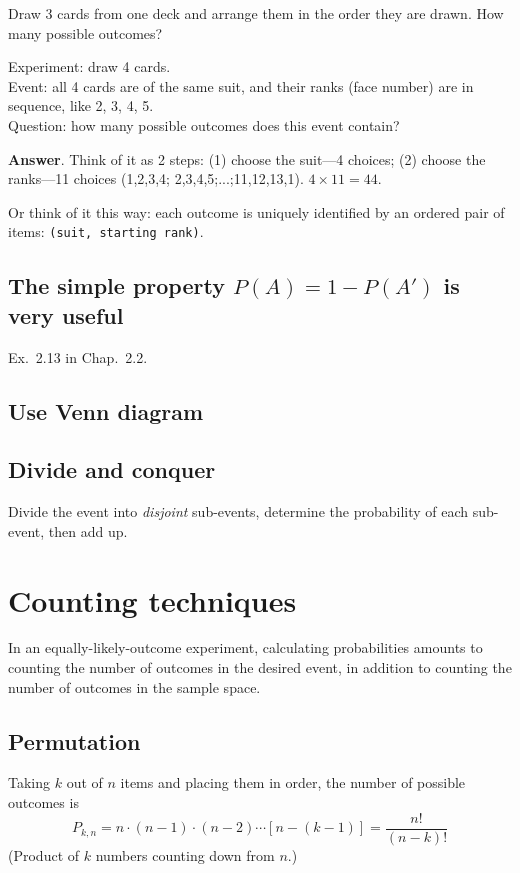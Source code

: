 \documentclass[12pt]{article}
\begin{document}
\example
Draw 3 cards from one deck and arrange them in the order they are drawn.
How many possible outcomes?

\example
Experiment: draw 4 cards.\\
Event: all 4 cards are of the same suit, and their ranks (face
number) are in sequence, like 2, 3, 4, 5.\\
Question: how many possible outcomes does this event contain?

\textbf{Answer}.
Think of it as 2 steps: (1) choose the suit---4 choices;
(2) choose the ranks---11 choices (1,2,3,4; 2,3,4,5;...;11,12,13,1).
$4 \times 11 = 44$.

Or think of it this way: each outcome is uniquely identified
by an ordered pair of items:
\texttt{(suit, starting rank)}.

\subsection{The simple property $P(A) = 1 - P(A')$ is very useful}

\example Ex.~2.13 in Chap.~2.2.

\subsection{Use Venn diagram}

\subsection{Divide and conquer}
    Divide the event into \emph{disjoint} sub-events, determine the probability
    of each sub-event, then add up.


\section{Counting techniques}

In an equally-likely-outcome experiment,
calculating probabilities amounts to counting
the number of outcomes in the desired event,
in addition to counting the number of outcomes in the sample space.

\subsection*{Permutation}

Taking $k$ out of $n$ items and placing them in order,
the number of possible outcomes is
\[
P_{k,n} = n \cdot (n-1) \cdot (n-2) \dotsb [n - (k-1)]
    = \frac{n!}{(n-k)!}
\]
(Product of $k$ numbers counting down from $n$.)
\end{document}
